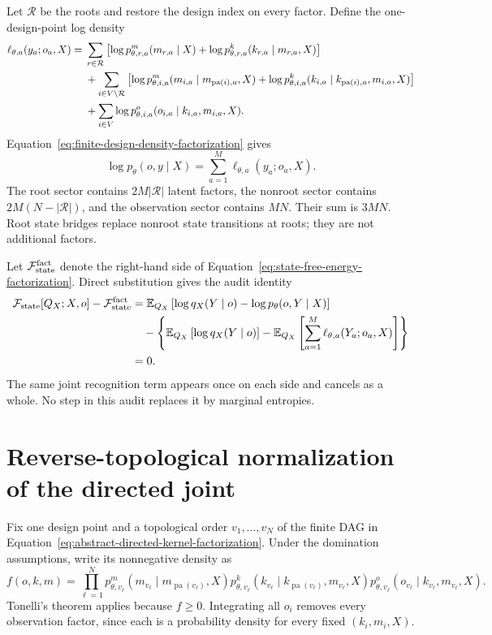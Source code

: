 Let \(\mathcal R\) be the roots and restore the design index on every factor. Define the one-design-point log density
\begin{align}
\ell_{\theta,a}(y_a;o_a,X)
={}&\sum_{r\in\mathcal R}
\left[
\log p_{\theta,r,a}^{m}(m_{r,a}\mid X)
+\log p_{\theta,r,a}^{k}(k_{r,a}\mid m_{r,a},X)
\right]
\label{eq:appendix-one-point-log-factorization}\\
&+\sum_{i\in V\setminus\mathcal R}
\left[
\log p_{\theta,i,a}^{m}
(m_{i,a}\mid m_{\operatorname{pa}(i),a},X)
+\log p_{\theta,i,a}^{k}
(k_{i,a}\mid k_{\operatorname{pa}(i),a},m_{i,a},X)
\right]\notag\\
&+\sum_{i\in V}
\log p_{\theta,i,a}^{o}
(o_{i,a}\mid k_{i,a},m_{i,a},X).\notag
\end{align}
Equation~\eqref{eq:finite-design-density-factorization} gives
\begin{equation}
\log p_\theta(o,y\mid X)
=\sum_{a=1}^{M}\ell_{\theta,a}(y_a;o_a,X).
\label{eq:appendix-finite-design-log-factorization}
\end{equation}
The root sector contains \(2M|\mathcal R|\) latent factors, the nonroot sector contains \(2M(N-|\mathcal R|)\), and the observation sector contains \(MN\). Their sum is \(3MN\). Root state bridges replace nonroot state transitions at roots; they are not additional factors.

Let \(\mathcal F_{\mathrm{state}}^{\mathrm{fact}}\) denote the right-hand side of Equation~\eqref{eq:state-free-energy-factorization}. Direct substitution gives the audit identity
\begin{align}
\mathcal F_{\mathrm{state}}[Q_X;X,o]-\mathcal F_{\mathrm{state}}^{\mathrm{fact}}
&=\mathbb E_{Q_X}\left[
\log q_X(Y\mid o)-\log p_\theta(o,Y\mid X)
\right]\notag\\
&\quad-
\left\{
\mathbb E_{Q_X}\left[\log q_X(Y\mid o)\right]
-\mathbb E_{Q_X}\left[
\sum_{a=1}^{M}\ell_{\theta,a}(Y_a;o_a,X)
\right]
\right\}\notag\\
&=0.
\label{eq:appendix-factorization-zero-residual}
\end{align}
The same joint recognition term appears once on each side and cancels as a whole. No step in this audit replaces it by marginal entropies.

\section{Reverse-topological normalization of the directed joint}
\label{sec:directed-normalization-proof}

Fix one design point and a topological order \(v_1,\ldots,v_N\) of the finite DAG in Equation~\eqref{eq:abstract-directed-kernel-factorization}. Under the domination assumptions, write its nonnegative density as
\begin{equation}
f(o,k,m)
=\prod_{\ell=1}^{N}
p_{\theta,v_\ell}^{m}(m_{v_\ell}\mid m_{\operatorname{pa}(v_\ell)},X)
p_{\theta,v_\ell}^{k}(k_{v_\ell}\mid k_{\operatorname{pa}(v_\ell)},m_{v_\ell},X)
p_{\theta,v_\ell}^{o}(o_{v_\ell}\mid k_{v_\ell},m_{v_\ell},X).
\label{eq:appendix-directed-density}
\end{equation}
Tonelli's theorem applies because \(f\geq0\). Integrating all \(o_i\) removes every observation factor, since each is a probability density for every fixed \((k_i,m_i,X)\).

